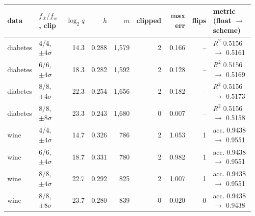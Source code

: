 \begin{tabular}{llrrrrrrl}
\toprule
data & $f_X/f_w$, clip & $\log_2 q$ & $h$ & $m$ & clipped & max err & flips & metric (float $\to$ scheme) \\
\midrule
diabetes & 4/4, $\pm4\sigma$ & 14.3 & 0.288 & 1{,}579 & 2 & 0.166 & -- & $R^2$ 0.5156 $\to$ 0.5161 \\
diabetes & 6/6, $\pm4\sigma$ & 18.3 & 0.282 & 1{,}592 & 2 & 0.128 & -- & $R^2$ 0.5156 $\to$ 0.5169 \\
diabetes & 8/8, $\pm4\sigma$ & 22.3 & 0.254 & 1{,}656 & 2 & 0.182 & -- & $R^2$ 0.5156 $\to$ 0.5173 \\
diabetes & 8/8, $\pm8\sigma$ & 23.3 & 0.243 & 1{,}680 & 0 & 0.007 & -- & $R^2$ 0.5156 $\to$ 0.5158 \\
\midrule
wine & 4/4, $\pm4\sigma$ & 14.7 & 0.326 & 786 & 2 & 1.053 & 1 & acc. 0.9438 $\to$ 0.9551 \\
wine & 6/6, $\pm4\sigma$ & 18.7 & 0.331 & 780 & 2 & 0.982 & 1 & acc. 0.9438 $\to$ 0.9551 \\
wine & 8/8, $\pm4\sigma$ & 22.7 & 0.292 & 825 & 2 & 1.007 & 1 & acc. 0.9438 $\to$ 0.9551 \\
wine & 8/8, $\pm8\sigma$ & 23.7 & 0.280 & 839 & 0 & 0.020 & 0 & acc. 0.9438 $\to$ 0.9438 \\
\bottomrule
\end{tabular}
